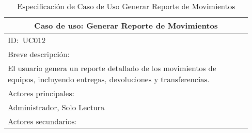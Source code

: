 \documentclass[stu, 12pt, letterpaper, donotrepeattitle, floatsintext, natbib]{apa7}
\begin{document}
\begin{longtable}{@{} p{16.5cm} @{}}
    \caption{Especificaci\'on de Caso de Uso Generar Reporte de Movimientos}\label{tab:UC012}                                                                                                                                                                                        \\ \toprule
    \multicolumn{1}{c}{Caso de uso: Generar Reporte de Movimientos}                                                                                                                                                                                                                  \\ \midrule
    ID:~UC012                                                                                                                                                                                                                                                                        \\ \midrule
    Breve descripci\'on:                                                                                                                                                                                                                                                             \\
    El usuario genera un reporte detallado de los movimientos de equipos, incluyendo entregas, devoluciones y transferencias.                                                                                                                                                        \\ \midrule
    Actores principales:                                                                                                                                                                                                                                                             \\
    Administrador, Solo Lectura                                                                                                                                                                                                                                                      \\ \midrule
    Actores secundarios:                                                                                                                                                                                                                                                             \\

\end{longtable}
\end{document}
